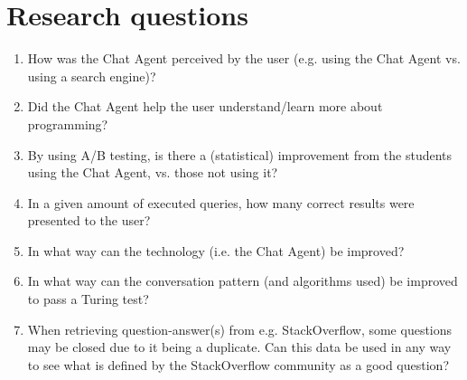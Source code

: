 \section{Research questions}
\label{chapter2:research_questions}
\begin{enumerate}
	\item \label{res_q1} How was the Chat Agent perceived by the user (e.g. using the Chat Agent vs. using a search engine)?
	\item \label{res_q2} Did the Chat Agent help the user understand/learn more about programming?
	\item \label{res_q3} By using A/B testing, is there a (statistical) improvement from the students using the Chat Agent, vs. those not using it?
	\item \label{res_q4} In a given amount of executed queries, how many correct results were presented to the user? 
	\item \label{res_q5} In what way can the technology (i.e. the Chat Agent) be improved? 
	\item \label{res_q6} In what way can the conversation pattern (and algorithms used) be improved to pass a Turing test?
	\item \label{res_q7} When retrieving question-answer(s) from e.g. StackOverflow, some questions may be closed due to it being a duplicate. 
	Can this data be used in any way to see what is defined by the StackOverflow community as a good question?
\end{enumerate}

